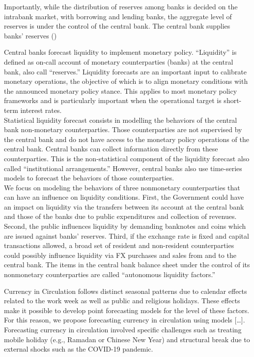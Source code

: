 Importantly, while the distribution of reserves  among banks is decided on the
intrabank market,  with borrowing  and lending banks,  the aggregate  level of
reserves is under  the control of the central bank.  The central bank supplies
banks' reserves ()

Central banks forecast liquidity to  implement monetary policy. “Liquidity” is
defined as on-call  account of monetary counterparties (banks)  at the central
bank,  also call  “reserves.” Liquidity  forecasts are  an important  input to
calibrate monetary  operations, the  objective of which  is to  align monetary
conditions with  the announced  monetary policy stance.  This applies  to most
monetary policy frameworks and is  particularly important when the operational
target is short-term interest rates.\\

Statistical  liquidity forecast  consists in  modelling the  behaviors of  the
central  bank  non-monetary  counterparties.   Those  counterparties  are  not
supervised by the central  bank and do not have access  to the monetary policy
operations of the central bank. Central banks can collect information directly
from  these  counterparties. This  is  the  non-statistical component  of  the
liquidity forecast also called “institutional arrangements.”  However, central
banks  also  use  time-series  models  to  forecast  the  behaviors  of  those
counterparties.\\

We focus  on modeling the  behaviors of three nonmonetary  counterparties that
can have  an influence  on liquidity conditions.  First, the  Government could
have  an impact  on liquidity  via the  transfers between  its account  at the
central bank and those of the  banks due to public expenditures and collection
of revenues.  Second, the public  influences liquidity by  demanding banknotes
and coins  which are issued  against banks’  reserves. Third, if  the exchange
rate is  fixed and capital transactions  allowed, a broad set  of resident and
non-resident  counterparties   could  possibly  influence  liquidity   via  FX
purchases and  sales from and  to the central bank.  The items in  the central
bank balance  sheet under  the control of  its nonmonetary  counterparties are
called “autonomous liquidity factors.”

Currency in  Circulation follows  distinct seasonal  patterns due  to calendar
effects  related   to  the  work  week   as  well  as  public   and  religious
holidays. These effects  make it possible to develop  point forecasting models
for  the level  of  these factors.  For this  reason,  we propose  forecasting
currency in circulation using models  […]. Forecasting currency in circulation
involved specific challenges such as treating mobile holiday (e.g., Ramadan or
Chinese New  Year) and  structural break  due to external  shocks such  as the
COVID-19 pandemic.

